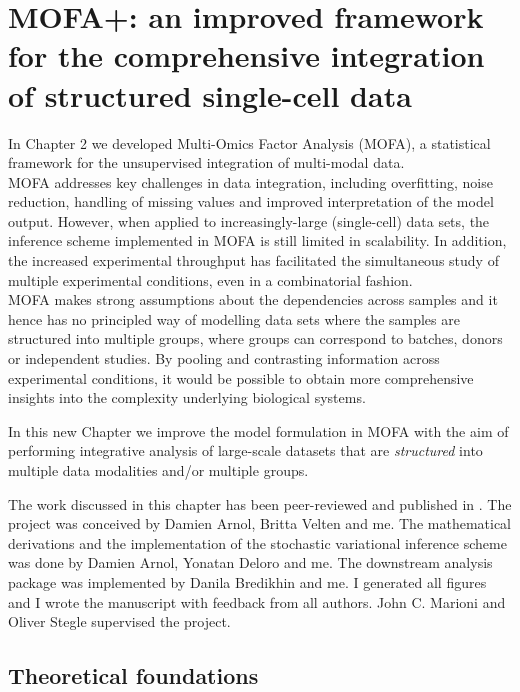 \graphicspath{{Chapter4/Figs/simulations/}{Chapter4/Figs/scrna/}{Chapter4/Figs/scmet/}{Chapter4/Figs/scnmt/}}

\chapter{MOFA+: an improved framework for the comprehensive integration of structured single-cell data}

In Chapter 2 we developed Multi-Omics Factor Analysis (MOFA), a statistical framework for the unsupervised integration of multi-modal data. \\
MOFA addresses key challenges in data integration, including overfitting, noise reduction, handling of missing values and improved interpretation of the model output. However, when applied to increasingly-large (single-cell) data sets, the inference scheme implemented in MOFA is still limited in scalability. In addition, the increased experimental throughput has facilitated the simultaneous study of multiple experimental conditions, even in a combinatorial fashion\cite{Replogle2020}.\\
MOFA makes strong assumptions about the dependencies across samples and it hence has no principled way of modelling data sets where the samples are structured into multiple groups, where groups can correspond to batches, donors or independent studies. By pooling and contrasting information across experimental conditions, it would be possible to obtain more comprehensive insights into the complexity underlying biological systems.

In this new Chapter we improve the model formulation in MOFA with the aim of performing integrative analysis of large-scale datasets that are \textit{structured} into multiple data modalities and/or multiple groups.

The work discussed in this chapter has been peer-reviewed and published in \cite{Argelaguet2020}. The project was conceived by Damien Arnol, Britta Velten and me. The mathematical derivations and the implementation of the stochastic variational inference scheme was done by Damien Arnol, Yonatan Deloro and me. The downstream analysis package was implemented by Danila Bredikhin and me. I generated all figures and I wrote the manuscript with feedback from all authors. John C. Marioni and Oliver Stegle supervised the project. 

\section{Theoretical foundations}


